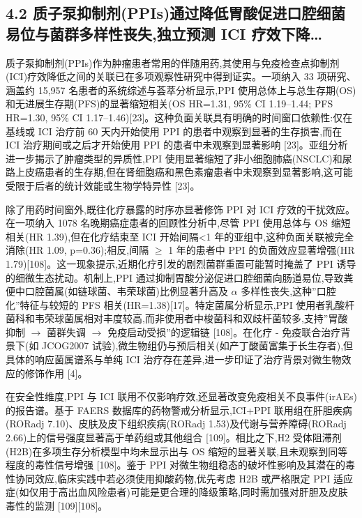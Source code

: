 \documentclass[11pt]{article}
\begin{document}
\subsection{4.2 质子泵抑制剂(PPIs)通过降低胃酸促进口腔细菌易位与菌群多样性丧失,独立预测 ICI 疗效下降\ldots{}}\label{ux8d28ux5b50ux6cf5ux6291ux5236ux5242ppisux901aux8fc7ux964dux4f4eux80c3ux9178ux4fc3ux8fdbux53e3ux8154ux7ec6ux83ccux6613ux4f4dux4e0eux83ccux7fa4ux591aux6837ux6027ux4e27ux5931ux72ecux7acbux9884ux6d4b-ici-ux7597ux6548ux4e0bux964d}

质子泵抑制剂(PPIs)作为肿瘤患者常用的伴随用药,其使用与免疫检查点抑制剂(ICI)疗效降低之间的关联已在多项观察性研究中得到证实。一项纳入 33 项研究、涵盖约 15,957 名患者的系统综述与荟萃分析显示,PPI 使用总体上与总生存期(OS)和无进展生存期(PFS)的显著缩短相关(OS HR=1.31, 95\% CI 1.19--1.44; PFS HR=1.30, 95\% CI 1.17--1.46){[}23{]}。这种负面关联具有明确的时间窗口依赖性:仅在基线或 ICI 治疗前 60 天内开始使用 PPI 的患者中观察到显著的生存损害,而在 ICI 治疗期间或之后才开始使用 PPI 的患者中未观察到显著影响 {[}23{]}。亚组分析进一步揭示了肿瘤类型的异质性,PPI 使用显著缩短了非小细胞肺癌(NSCLC)和尿路上皮癌患者的生存期,但在肾细胞癌和黑色素瘤患者中未观察到显著影响,这可能受限于后者的统计效能或生物学特异性 {[}23{]}。

除了用药时间窗外,既往化疗暴露的时序亦显著修饰 PPI 对 ICI 疗效的干扰效应。在一项纳入 1078 名晚期癌症患者的回顾性分析中,尽管 PPI 使用总体与 OS 缩短相关(HR 1.39),但在化疗结束至 ICI 开始间隔\textless1 年的亚组中,这种负面关联被完全消除(HR 1.09, p=0.36);相反,间隔 \(\geq\) 1 年的患者中 PPI 的负面效应显著增强(HR 1.79){[}108{]}。这一现象提示,近期化疗引发的剧烈菌群重置可能暂时掩盖了 PPI 诱导的细微生态扰动。机制上,PPI 通过抑制胃酸分泌促进口腔细菌向肠道易位,导致粪便中口腔菌属(如链球菌、韦荣球菌)比例显著升高及 \(\alpha\) 多样性丧失,这种''口腔化''特征与较短的 PFS 相关(HR=1.38){[}17{]}。特定菌属分析显示,PPI 使用者乳酸杆菌科和韦荣球菌属相对丰度较高,而非使用者中梭菌科和双歧杆菌较多,支持''胃酸抑制 \(\rightarrow\) 菌群失调 \(\rightarrow\) 免疫启动受损''的逻辑链 {[}108{]}。在化疗 - 免疫联合治疗背景下(如 JCOG2007 试验),微生物组仍与预后相关(如产丁酸菌富集于长生存者),但具体的响应菌属谱系与单纯 ICI 治疗存在差异,进一步印证了治疗背景对微生物效应的修饰作用 {[}4{]}。

在安全性维度,PPI 与 ICI 联用不仅影响疗效,还显著改变免疫相关不良事件(irAEs)的报告谱。基于 FAERS 数据库的药物警戒分析显示,ICI+PPI 联用组在肝胆疾病(RORadj 7.10)、皮肤及皮下组织疾病(RORadj 1.53)及代谢与营养障碍(RORadj 2.66)上的信号强度显著高于单药组或其他组合 {[}109{]}。相比之下,H2 受体阻滞剂(H2B)在多项生存分析模型中均未显示出与 OS 缩短的显著关联,且未观察到同等程度的毒性信号增强 {[}108{]}。鉴于 PPI 对微生物组稳态的破坏性影响及其潜在的毒性协同效应,临床实践中若必须使用抑酸药物,优先考虑 H2B 或严格限定 PPI 适应症(如仅用于高出血风险患者)可能是更合理的降级策略,同时需加强对肝胆及皮肤毒性的监测 {[}109{]}{[}108{]}。
\end{document}
